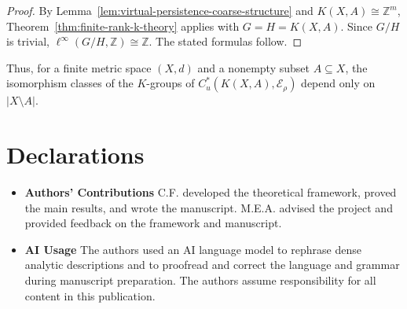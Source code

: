 \documentclass[pdflatex,sn-mathphys-num]{sn-jnl}%
\theoremstyle{plain}
\theoremstyle{remark}
\theoremstyle{definition}
\numberwithin{equation}{section}
\begin{document}
\begin{proof}
By Lemma~\ref{lem:virtual-persistence-coarse-structure} and \( K(X,A)\cong\mathbb Z^m \), Theorem~\ref{thm:finite-rank-k-theory} applies with \( G=H=K(X,A) \). Since \( G/H \) is trivial, \( \ell^\infty(G/H,\mathbb Z)\cong\mathbb Z \). The stated formulas follow.
\end{proof}

Thus, for a finite metric space \( (X,d) \) and a nonempty subset \( A\subseteq X \), the isomorphism classes of the \( K \)-groups of \( C_u^*(K(X,A),\mathcal E_\rho) \) depend only on \( |X\setminus A| \).

\section*{Declarations}

\begin{itemize}
\item \textbf{Authors' Contributions}
C.F. developed the theoretical framework, proved the main results, and wrote the manuscript. M.E.A. advised the project and provided feedback on the framework and manuscript.
\item \textbf{AI Usage} The authors used an AI language model to rephrase dense analytic descriptions and to proofread and correct the language and grammar during manuscript preparation. The authors assume responsibility for all content in this publication.
\end{itemize}

\end{document}
